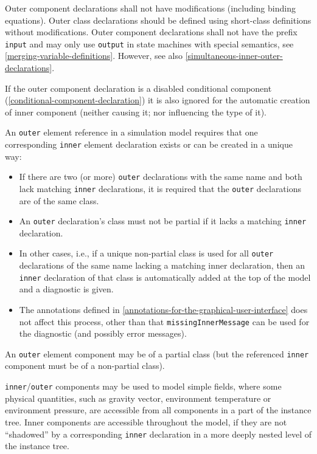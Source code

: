 Outer component declarations shall not have modifications (including binding equations).
Outer class declarations should be defined using short-class definitions without modifications.
Outer component declarations shall not have the prefix \lstinline!input! and may only use \lstinline!output! in state machines with special semantics, see \cref{merging-variable-definitions}.
However, see also \cref{simultaneous-inner-outer-declarations}.

If the outer component declaration is a disabled conditional component (\cref{conditional-component-declaration}) it is also ignored for the automatic creation of inner component (neither causing it; nor influencing the type of it).

An \lstinline!outer! element reference in a simulation model requires that one corresponding \lstinline!inner! element declaration exists or can be created in a unique way:
\begin{itemize}
\item
  If there are two (or more) \lstinline!outer! declarations with the same name and both lack matching \lstinline!inner! declarations, it is required that the \lstinline!outer! declarations are of the same class.
\item
  An \lstinline!outer! declaration's class must not be partial if it lacks a matching \lstinline!inner! declaration.
\item
  In other cases, i.e., if a unique non-partial class is used for all \lstinline!outer! declarations of the same name lacking a matching inner declaration, then an \lstinline!inner! declaration of that class is automatically added at the top of the model and a diagnostic is given.
\item
  The annotations defined in \cref{annotations-for-the-graphical-user-interface} does not affect this process, other than that \lstinline!missingInnerMessage! can be used for the diagnostic (and possibly error messages).
\end{itemize}

An \lstinline!outer! element component may be of a partial class (but the referenced \lstinline!inner! component must be of a non-partial class).

\begin{nonnormative}
\lstinline!inner!/\lstinline!outer! components may be used to model simple fields, where some physical quantities, such as gravity vector, environment temperature or environment pressure, are accessible from all components in a part of the instance tree.
Inner components are accessible throughout the model, if they are not ``shadowed'' by a corresponding \lstinline!inner! declaration in a more deeply nested level of the instance tree.
\end{nonnormative}

